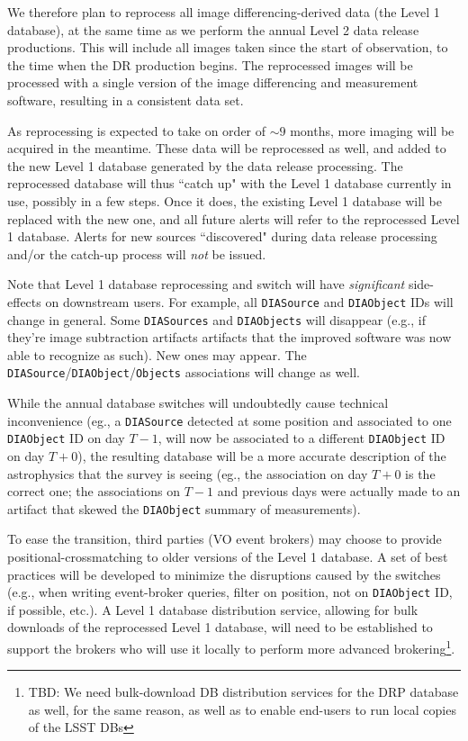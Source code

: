 \documentclass[12pt]{article}
\newcommand{\code}[1]{\texttt{#1}}
\newcommand{\DIASource}{\code{DIASource}\xspace}
\newcommand{\DIASources}{\code{DIASources}\xspace}
\newcommand{\DIAObject}{\code{DIAObject}\xspace}
\newcommand{\DIAObjects}{\code{DIAObjects}\xspace}
\newcommand{\DB}{{Level 1 database}\xspace}
\newcommand{\Objects}{\code{Objects}\xspace}
\begin{document}
We therefore plan to reprocess all image differencing-derived data (the \DB), at the same time as we perform the annual Level 2 data release productions. This will include all images taken since the start of observation, to the time when the DR production begins. The reprocessed images will be processed with a single version of the image differencing and measurement software, resulting in a consistent data set.

As reprocessing is expected to take on order of $\sim 9$ months, more imaging will be acquired in the meantime. These data will be reprocessed as well, and added to the new \DB generated by the data release processing. The reprocessed database will thus ``catch up" with the \DB currently in use, possibly in a few steps. Once it does, the existing \DB will be replaced with the new one, and all future alerts will refer to the reprocessed \DB. Alerts for new sources ``discovered" during data release processing and/or the catch-up process will {\em not} be issued.

\vspace{1em}
Note that \DB reprocessing and switch will have {\em significant} side-effects on downstream users. For example, all \DIASource and \DIAObject IDs will change in general. Some \DIASources and \DIAObjects will disappear (e.g., if they're image subtraction artifacts artifacts that the improved software was now able to recognize as such). New ones may appear. The \DIASource/\DIAObject/\Objects associations will change as well.

While the annual database switches will undoubtedly cause technical inconvenience (eg., a \DIASource detected at some position and associated to one \DIAObject ID on day $T-1$, will now be associated to a different \DIAObject ID on day $T+0$), the resulting database will be a more accurate description of the astrophysics that the survey is seeing (eg., the association on day $T+0$ is the correct one; the associations on $T-1$ and previous days were actually made to an artifact that skewed the \DIAObject summary of measurements).

To ease the transition, third parties (VO event brokers) may choose to provide positional-crossmatching to older versions of the \DB. A set of best practices will be developed to minimize the disruptions caused by the switches (e.g., when writing event-broker queries, filter on position, not on \DIAObject ID, if possible, etc.). A \DB distribution service, allowing for bulk downloads of the reprocessed \DB, will need to be established to support the brokers who will use it locally to perform more advanced brokering\footnote{TBD: We need bulk-download DB distribution services for the DRP database as well, for the same reason, as well as to enable end-users to run local copies of the LSST DBs}.
\end{document}
